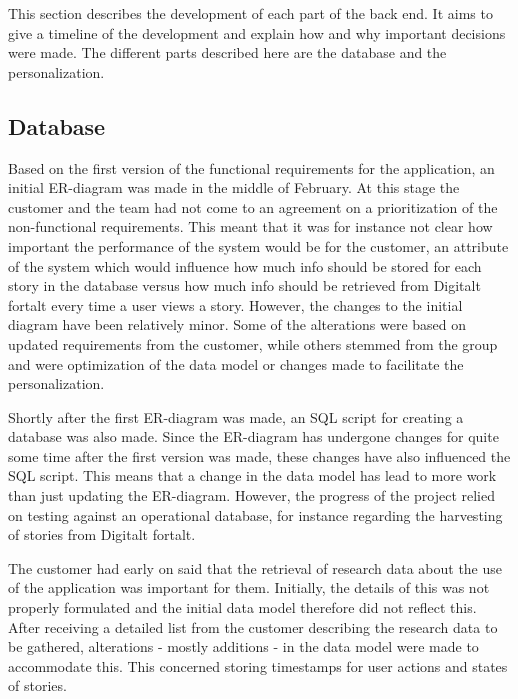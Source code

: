 This section describes the development of each part of the back end. It aims to give a timeline of the development and explain how and why important decisions were made. The different parts described here are the database and the personalization.  

\subsection{Database}

Based on the first version of the functional requirements for the application, an initial ER-diagram was made in the middle of February. At this stage the customer and the team had not come to an agreement on a prioritization of the non-functional requirements. This meant that it was for instance not clear how important the performance of the system would be for the customer, an attribute of the system which would influence how much info should be stored for each story in the database versus how much info should be retrieved from Digitalt fortalt every time a user views a story. However, the changes to the initial diagram have been relatively minor. Some of the alterations were based on updated requirements from the customer, while others stemmed from the group and were optimization of the data model or changes made to facilitate the personalization. \newline

Shortly after the first ER-diagram was made, an SQL script for creating a database was also made. Since the ER-diagram has undergone changes for quite some time after the first version was made, these changes have also influenced the SQL script. This means that a change in the data model has lead to more work than just updating the ER-diagram. However, the progress of the project relied on testing against an operational database, for instance regarding the harvesting of stories from Digitalt fortalt. \newline

The customer had early on said that the retrieval of research data about the use of the application was important for them. Initially, the details of this was not properly formulated and the initial data model therefore did not reflect this. After receiving a detailed list from the customer describing the research data to be gathered, alterations - mostly additions - in the data model were made to accommodate this. This concerned storing timestamps for user actions and states of stories.  \newline

